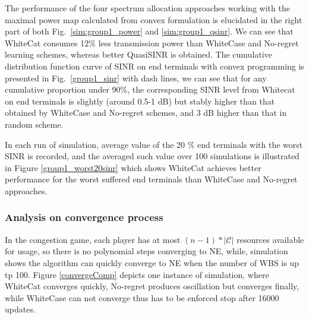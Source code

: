 The performance of the four spectrum allocation approaches working with the maximal power map calculated from convex formulation is elucidated in the right part of both Fig.~\ref{sim:group1_power} and \ref{sim:group1_qsinr}. 
We can see that WhiteCat consumes 12\% less transmission power than WhiteCase and No-regret learning schemes, whereas better QuasiSINR is obtained. 
The cumulative distribution function curve of SINR on end terminals with convex programming is presented in Fig.~\ref{group1_sinr} with dash lines, we can see that for any cumulative proportion under 90\%, the corresponding SINR level from Whitecat on end terminals is slightly (around 0.5-1 dB) but stably higher than that obtained by WhiteCase and No-regret schemes, and 3 dB higher than that in random scheme.

In each run of simulation, average value of the 20 \% end terminals with the worst SINR is recorded, and the averaged such value over 100 simulations is illustrated in Figure \ref{group1_worst20sinr} which shows WhiteCat achieves better performance for the worst suffered end terminals than WhiteCase and No-regret approaches.




\subsubsection{Analysis on convergence process}

In the congestion game, each player has at most $(n-1)*|\mathcal{C}|$ resources available for usage, so there is no polynomial steps converging to NE, while, simulation shows the algorithm can quickly converge to NE when the number of WBS is up tp 100. 
Figure \ref{convergeComp} depicts one instance of simulation, where WhiteCat converges quickly, No-regret produces oscillation but converges finally, while WhiteCase can not converge thus has to be enforced stop after 16000 updates. %

